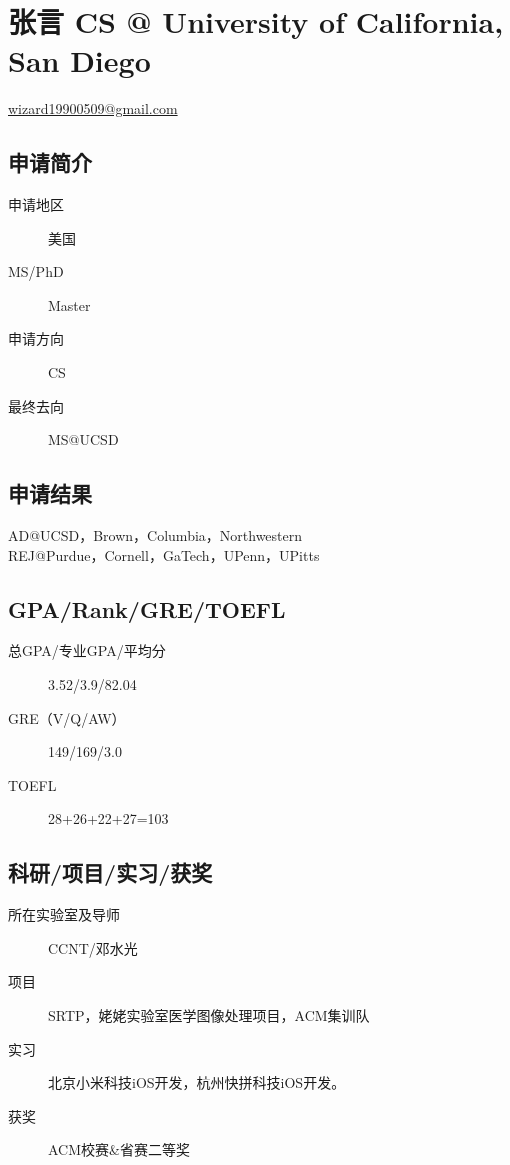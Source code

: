 \documentclass[11pt,fleqn,openany]{book} %
\begin{document}
\section{张言 CS @ University of California, San Diego}
\hfill \href{mailto:wizard19900509@gmail.com}{wizard19900509@gmail.com}

\noindent\begin{minipage}[t]{0.45\textwidth}
\subsection*{申请简介}
\begin{description}
\item[申请地区] 美国
\item[MS/PhD] Master
\item[申请方向] CS
\item[最终去向] MS@UCSD
\end{description}
\end{minipage}
\hfill
\begin{minipage}[t]{0.45\textwidth}
\subsection*{申请结果}
\noindent AD@UCSD，Brown，Columbia，Northwestern\\
REJ@Purdue，Cornell，GaTech，UPenn，UPitts
\end{minipage}
\subsection*{GPA/Rank/GRE/TOEFL}
\begin{description}
\item[总GPA/专业GPA/平均分] 3.52/3.9/82.04
\item[GRE（V/Q/AW）] 149/169/3.0
\item[TOEFL] 28+26+22+27=103
\end{description}

\subsection*{科研/项目/实习/获奖}
\begin{description}
\item[所在实验室及导师] CCNT/邓水光
\item[项目] SRTP，姥姥实验室医学图像处理项目，ACM集训队
\item[实习] 北京小米科技iOS开发，杭州快拼科技iOS开发。
\item[获奖] ACM校赛\&省赛二等奖
\end{description}
\end{document}
